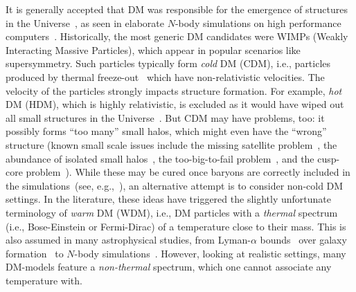It is generally accepted that DM was responsible for the emergence of structures in the Universe~\cite{Primack:1997av}, as seen in elaborate $N$-body simulations on high performance computers~\cite{Springel:2005nw}. Historically, the most generic DM candidates were WIMPs (Weakly Interacting Massive Particles), which appear in popular scenarios like supersymmetry. Such particles typically form \emph{cold} DM (CDM), i.e., particles produced by thermal freeze-out~\cite{Lee:1977ua,Bernstein:1985th} which have non-relativistic velocities. The velocity of the particles strongly impacts structure formation. For example, \emph{hot} DM (HDM), which is highly relativistic, is excluded as it would have wiped out all small structures in the Universe~\cite{Abazajian:2004zh,dePutter:2012sh}. But CDM may have problems, too: it possibly forms ``too many'' small halos, which might even have the ``wrong'' structure (known small scale issues include the missing satellite problem~\cite{Klypin:1999uc,Moore:1999nt}, the abundance of isolated small halos~\cite{Klypin:2014ira}, the too-big-to-fail problem~\cite{BoylanKolchin:2011de,Papastergis:2014aba}, and the cusp-core problem~\cite{Dubinski:1991bm,Moore:1994yx}). While these may be cured once baryons are correctly included in the simulations~(see, e.g.,~\cite{Schaller:2014uwa,Chan:2015tna,Henson:2016eip}), an alternative attempt is to consider non-cold DM settings. In the literature, these ideas have triggered the slightly unfortunate terminology of \emph{warm} DM (WDM), i.e., DM particles with a \emph{thermal} spectrum (i.e., Bose-Einstein or Fermi-Dirac) of a temperature close to their mass. This is also assumed in many astrophysical studies, from Lyman-$\alpha$ bounds~\cite{Narayanan:2000tp,Viel:2005qj,Boyarsky:2008xj,Viel:2013apy} over galaxy formation~\cite{Menci:2013ght,Menci:2016eww,Menci:2016eui} to $N$-body simulations~\cite{Yoshida:2003rm,Lovell:2013ola,Bose:2016irl}. However, looking at realistic settings, many DM-models feature a \emph{non-thermal} spectrum, which one cannot associate any temperature with.

